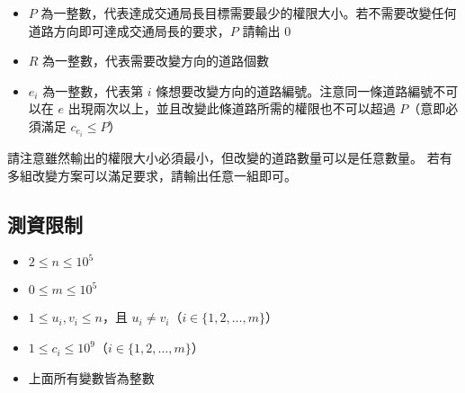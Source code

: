 \begin{itemize}
\tightlist
\item
  \begin{math}P\end{math}
  為一整數，代表達成交通局長目標需要最少的權限大小。若不需要改變任何道路方向即可達成交通局長的要求，\begin{math}P\end{math}
  請輸出 \begin{math}0\end{math}
\item
  \begin{math}R\end{math} 為一整數，代表需要改變方向的道路個數
\item
  \begin{math}e_i\end{math} 為一整數，代表第 \begin{math}i\end{math}
  條想要改變方向的道路編號。注意同一條道路編號不可以在
  \begin{math}e\end{math}
  出現兩次以上，並且改變此條道路所需的權限也不可以超過
  \begin{math}P\end{math}（意即必須滿足
  \begin{math}c_{e_i} \le P\end{math}）
\end{itemize}

請注意雖然輸出的權限大小必須最小，但改變的道路數量可以是任意數量。
若有多組改變方案可以滿足要求，請輸出任意一組即可。

\subsection{測資限制}

\begin{itemize}
\tightlist
\item
  \begin{math}2 \le n \le 10^5\end{math}
\item
  \begin{math}0 \le m \le 10^5\end{math}
\item
  \begin{math}1 \le u_i, v_i \le n\end{math}，且
  \begin{math}u_i \neq v_i\end{math}（\begin{math}i \in \{1, 2, \ldots, m\}\end{math}）
\item
  \begin{math}1 \le c_i \le 10^9\end{math}（\begin{math}i \in \{1, 2, \ldots, m\}\end{math}）
\item
  上面所有變數皆為整數
\end{itemize}

